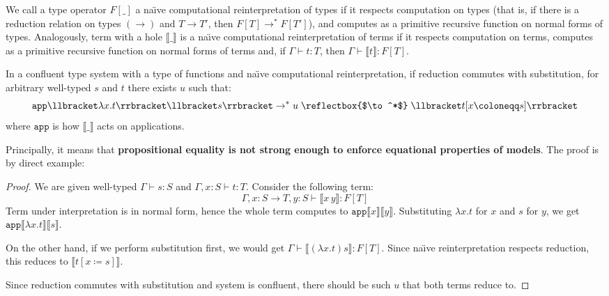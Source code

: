 \begin{definition}
    We call a type operator $F[\_]$ a na\"{\i}ve
    computational reinterpretation of types if it
    respects computation on types (that is, if there is
    a reduction relation on types $(\to)$ and $T\to T'$,
    then $F[T]\to^* F[T']$), and computes as a primitive
    recursive function on normal forms of types.
    Analogously, term with a hole
    $\llbracket\_\rrbracket$ is a na\"{\i}ve
    computational reinterpretation of terms if it
    respects computation on terms, computes as a
    primitive recursive function on normal forms of
    terms and, if $\Gamma\vdash t:T$, then
    $\Gamma\vdash\llbracket t\rrbracket:F[T]$.
\end{definition}

\begin{theorem}
\label{no-go}
    In a confluent type system with a type of functions
    and na\"{\i}ve computational reinterpretation, if
    reduction commutes with substitution, for arbitrary
    well-typed $s$ and $t$ there exists $u$ such that:
    \[
        \mathtt{app}\llbracket\lambda x.t\rrbracket
        \llbracket s \rrbracket \to^* u\;
        \text{\reflectbox{$\to^*$}}\;
        \llbracket t[x\coloneqq s] \rrbracket
    \]
    where $\mathtt{app}$ is how $\llbracket\_\rrbracket$
    acts on applications.
\end{theorem}

Principally, it means that \textbf{propositional
equality is not strong enough to enforce equational
properties of models}. The proof is by direct example:

\begin{proof}
    We are given well-typed $\Gamma\vdash s:S$ and
    $\Gamma,x:S\vdash t:T$. Consider the following term:
    \[
        \Gamma,x:S\to T,y:S\vdash
            \llbracket x\,y\rrbracket:F[T]
    \]
    Term under interpretation is in normal form, hence
    the whole term computes to $\mathtt{app}\llbracket x
    \rrbracket\llbracket y\rrbracket$.
    Substituting $\lambda x.t$ for $x$ and $s$ for $y$,
    we get $\mathtt{app}\llbracket\lambda x.t\rrbracket
    \llbracket s \rrbracket$.

    On the other hand, if we perform substitution first,
    we would get $\Gamma\vdash\llbracket(\lambda x.t)s
    \rrbracket:F[T]$. Since na\"{\i}ve reinterpretation
    respects reduction, this reduces to
    $\llbracket t[x\coloneqq s] \rrbracket$.

    Since reduction commutes with substitution and
    system is confluent, there should be such $u$ that
    both terms reduce to.
\end{proof}

